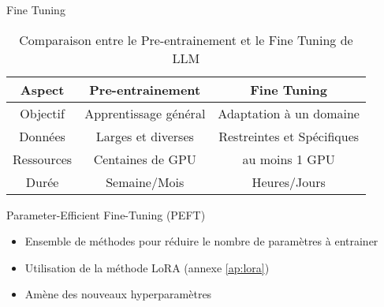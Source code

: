 \begin{frame}{Fine Tuning}
    \begin{table}[h!]
        \centering
        \begin{tabular}{|c|c|c|}
            \hline
            \textbf{Aspect} & \textbf{Pre-entrainement} & \textbf{Fine Tuning} \\
            \hline
            Objectif & Apprentissage général & Adaptation à un domaine \\
            \hline
            Données & Larges et diverses & Restreintes et Spécifiques \\
            \hline
            Ressources & Centaines de GPU & au moins 1 GPU \\
            \hline
            Durée & Semaine/Mois & Heures/Jours \\
            \hline
        \end{tabular}
        \caption{Comparaison entre le Pre-entrainement et le Fine Tuning de LLM}
        \label{tab:pretrain_vs_finetune}
    \end{table}

    \begin{block}{Parameter-Efficient Fine-Tuning (PEFT)}
        \begin{itemize}
            \item Ensemble de méthodes pour réduire le nombre de paramètres à entrainer
            \item Utilisation de la méthode LoRA (annexe \ref{ap:lora})
            \item Amène des nouveaux hyperparamètres
        \end{itemize}
        
    \end{block}
\end{frame}

